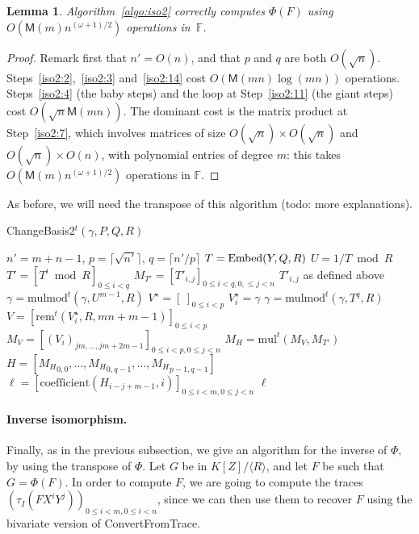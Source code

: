 \documentclass[12pt]{article}
\def\M {\ensuremath{\mathsf{M}}}
\def\F {\ensuremath{\mathbb{F}}}
\def\mul {\ensuremath{\mathrm{mul}}}
\def\rem {\ensuremath{\mathrm{rem}}}
\def\coeff {\ensuremath{\mathrm{coefficient}}}
\def\mulmod {\ensuremath{\mathrm{mulmod}}}
\newtheorem{Lemma}{Lemma}
\begin{document}
\begin{Lemma}
  Algorithm~\ref{algo:iso2} correctly computes $\Phi(F)$ using
  $O(\M(m) n^{(\omega+1)/2} )$ operations in~$\F$.
\end{Lemma}
\begin{proof}
  Remark first that $n'=O(n)$, and that $p$ and $q$ are both
  $O(\sqrt{n})$. Steps~\ref{iso2:2},~\ref{iso2:3} and~\ref{iso2:14}
  cost $O(\M(mn)\log(mn))$ operations. Steps~\ref{iso2:4} (the baby
  steps) and the loop at Step~\ref{iso2:11} (the giant steps) cost
  $O(\sqrt{n}\M(mn))$. The dominant cost is the matrix product at
  Step~\ref{iso2:7}, which involves matrices of size $O(\sqrt{n})
  \times O(\sqrt{n})$ and $O(\sqrt{n}) \times O(n)$, with polynomial
  entries of degree $m$: this takes $O(\M(m) n^{(\omega+1)/2})$ 
  operations in $\F$.
\end{proof}

As before, we will need the transpose of this algorithm (todo: more
explanations).
\begin{algorithm}[H]
  \caption{ChangeBasis2$^t(\gamma,P,Q,R)$}
  \begin{algorithmic}[1]
    \STATE $n'=m+n-1$, $p=\lceil \sqrt {n'} \rceil$, $q=\lceil n'/p\rceil$
    \STATE $T={\rm Embed}(Y,Q,R)$
    \STATE $U=1/T \bmod R$
    \STATE $T'=[T^i \bmod R]_{0 \le i < q}$
    \STATE $M_{T'}=[T'_{i,j}]_{0\le i < q, 0, \le j < n}$ \hfill $T'_{i,j}$ as defined above
    \STATE $\gamma = \mulmod^t(\gamma, U^{m-1}, R)$
    \STATE $V^\star=[\ ]_{0 \le i < p}$
    \STATE $V^\star_i = \gamma$
    \STATE $\gamma = \mulmod^t(\gamma,T^q,R)$
    \ENDFOR
    \STATE $V = [\rem^t(V^\star_i,R,mn+m-1)]_{0 \le i < p}$
    \STATE $M_V = [(V_{i})_{jm,\dots,jm+2m-1}]_{0 \le i < p, 0 \le j < n}$
    \STATE $M_H = \mul^t(M_V, M_{T'})$
    \STATE $H=[{M_H}_{0,0},\dots,{M_H}_{0,q-1},\dots,{M_H}_{p-1,q-1}]$
    \STATE $\ell=[\coeff(H_{i-j+m-1},i)]_{0 \le i < m, 0 \le j < n}$
    \RETURN $\ell$
  \end{algorithmic}
  \label{algo:tiso2}
\end{algorithm}

\paragraph{Inverse isomorphism.} Finally, as in the previous subsection, we 
give an algorithm for the inverse of $\Phi$, by using the transpose of
$\Phi$. Let $G$ be in $K[Z]/\langle R\rangle$, and let $F$ be such
that $G=\Phi(F)$. In order to compute $F$, we are going to compute the
traces $(\tau_I(F X^i Y^j))_{0 \le i < m, 0 \le i < n}$, since we can
then use them to recover $F$ using the bivariate version of
ConvertFromTrace.
\end{document}
